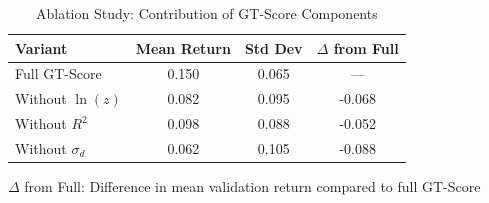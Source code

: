 
\begin{table}[htbp]
\centering
\caption{Ablation Study: Contribution of GT-Score Components}
\label{tab:ablation}
\begin{tabular}{lccc}
\toprule
\textbf{Variant} & \textbf{Mean Return} & \textbf{Std Dev} & \textbf{$\Delta$ from Full} \\
\midrule
Full GT-Score & 0.150 & 0.065 & --- \\
Without $\ln(z)$ & 0.082 & 0.095 & -0.068 \\
Without $R^2$ & 0.098 & 0.088 & -0.052 \\
Without $\sigma_d$ & 0.062 & 0.105 & -0.088 \\

\bottomrule
\end{tabular}
\begin{tablenotes}
\small
\item $\Delta$ from Full: Difference in mean validation return compared to full GT-Score
\end{tablenotes}
\end{table}

